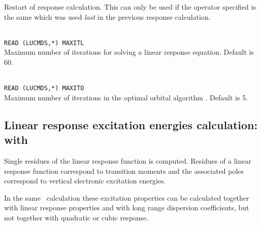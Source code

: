 \begin{description}
\item{}
Restart of response calculation. This
can only be used if the  
operator specified is the same which was used \textit{last} in the previous
response calculation.

\item{}\\
\verb|READ (LUCMDS,*) MAXITL|\\
Maximum number of iterations for solving a linear response 
equation. Default is 60.

\item{}\\
\verb|READ (LUCMDS,*) MAXITO|\\
Maximum number of iterations in the optimal orbital
algorithm
\cite{tuhjahjajpjjcp84}. 
Default is 5.


\end{description}

\subsection{Linear response excitation energies calculation:  with }

Single residues of the linear
response function is
computed. Residues of a linear response function correspond to
transition moments and the associated poles
correspond to vertical electronic excitation energies.

In the same \resp\ calculation these excitation properties can be calculated
together with linear response properties
and with long range dispersion coefficients, but not 
together with quadratic or cubic response.

